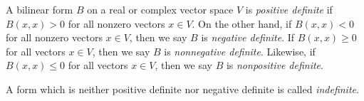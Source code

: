 \documentclass[12pt]{article}
\begin{document}
A bilinear form $B$ on a real or complex vector space $V$ is {\em positive definite} if $B(x,x) > 0$ for all nonzero vectors $x \in V$. On the other hand, if $B(x,x) < 0$ for all nonzero vectors $x \in V$, then we say $B$ is {\em negative definite}. If $B(x,x) \ge 0$ for all vectors $x \in V$, then we say 
   $B$ is {\em nonnegative definite}. Likewise, 
if $B(x,x) \le 0$ for all vectors $x \in V$, then we say 
   $B$ is {\em nonpositive definite}.

A form which is neither positive definite nor negative definite is called {\em indefinite}.
\end{document}
